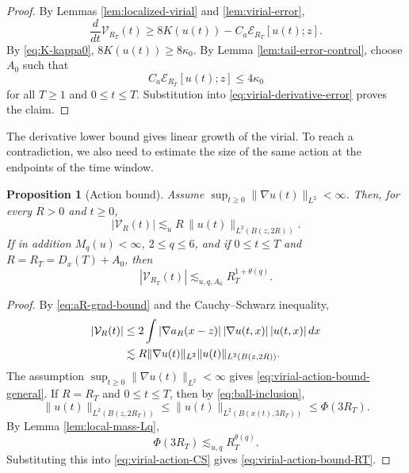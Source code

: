 \documentclass[10pt,a4paper]{amsart}
\numberwithin{equation}{section}
\newtheorem{proposition}[theorem]{Proposition}
\newcommand{\Vc}{\mathcal V}
\begin{document}
\begin{proof}
By Lemmas \ref{lem:localized-virial} and \ref{lem:virial-error},
\begin{equation}\label{eq:virial-derivative-error}
  \frac{d}{dt}\Vc_{R_T}(t)
  \ge8K(u(t))-C_a\mathcal E_{R_T}[u(t);z].
\end{equation}
By \eqref{eq:K-kappa0}, $8K(u(t))\ge8\kappa_0$. By Lemma \ref{lem:tail-error-control}, choose $A_0$ such that
\begin{equation*}
  C_a\mathcal E_{R_T}[u(t);z]\le4\kappa_0
\end{equation*}
for all $T\ge1$ and $0\le t\le T$. Substitution into \eqref{eq:virial-derivative-error} proves the claim.
\end{proof}

The derivative lower bound gives linear growth of the virial. To reach a contradiction, we also need to estimate the size of the same action at the endpoints of the time window.

\begin{proposition}[Action bound]\label{prop:virial-action-upper}
Assume $\sup_{t\ge0}\|\nabla u(t)\|_{L^2}<\infty$. Then, for every $R>0$ and $t\ge0$,
\begin{equation}\label{eq:virial-action-bound-general}
  |\Vc_R(t)|
  \lesssim_u R\,\|u(t)\|_{L^2(B(z,2R))}.
\end{equation}
If in addition $M_q(u)<\infty$, $2\le q\le6$, and if $0\le t\le T$ and $R=R_T=D_x(T)+A_0$, then
\begin{equation}\label{eq:virial-action-bound-RT}
  |\Vc_{R_T}(t)|
  \lesssim_{u,q,A_0} R_T^{1+\theta(q)}.
\end{equation}
\end{proposition}

\begin{proof}
By \eqref{eq:aR-grad-bound} and the Cauchy--Schwarz inequality,
\begin{align}
  |\Vc_R(t)|
  &\le2\int |\nabla a_R(x-z)|\,|\nabla u(t,x)|\,|u(t,x)|\,dx\notag\\
  &\lesssim R\|\nabla u(t)\|_{L^2}\|u(t)\|_{L^2(B(z,2R))}.
  \label{eq:virial-action-CS}
\end{align}
The assumption $\sup_{t\ge0}\|\nabla u(t)\|_{L^2}<\infty$ gives \eqref{eq:virial-action-bound-general}.
If $R=R_T$ and $0\le t\le T$, then by \eqref{eq:ball-inclusion},
\begin{equation*}
  \|u(t)\|_{L^2(B(z,2R_T))}
  \le\|u(t)\|_{L^2(B(x(t),3R_T))}
  \le\Phi(3R_T).
\end{equation*}
By Lemma \ref{lem:local-mass-Lq},
\begin{equation*}
  \Phi(3R_T)\lesssim_{u,q} R_T^{\theta(q)}.
\end{equation*}
Substituting this into \eqref{eq:virial-action-CS} gives \eqref{eq:virial-action-bound-RT}.
\end{proof}
\end{document}
